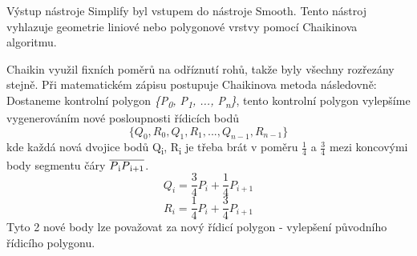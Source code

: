 Výstup nástroje Simplify byl vstupem do nástroje Smooth. Tento nástroj vyhlazuje geometrie
liniové nebo polygonové vrstvy pomocí Chaikinova algoritmu.

Chaikin využil fixních poměrů na odříznutí rohů, takže byly všechny rozřezány stejně. 
Při matematickém zápisu postupuje Chaikinova metoda následovně: Dostaneme kontrolní polygon 
\textit{\{P\textsubscript{0}, P\textsubscript{1}, ..., P\textsubscript{n}\}},
tento kontrolní polygon vylepšíme vygenerováním nové posloupnosti řídicích bodů 
\[ \{Q_0, R_0, Q_1, R_1, ...,  Q_{n−1}, R_{n−1}\} \]                                    
kde každá nová dvojice bodů Q\textsubscript{i}, R\textsubscript{i} je třeba brát v poměru \(\frac{1}{4}\)
a \(\frac{3}{4}\) mezi koncovými body segmentu čáry \(\overline{P\textsubscript{i}P\textsubscript{i+1}}\).
\[Q_i = \frac{3}{4}P_i + \frac{1}{4}P_{i+1}\]
\[R_i = \frac{1}{4}P_i + \frac{3}{4}P_{i+1}\]
Tyto 2 nové body lze považovat za nový řídicí polygon - vylepšení původního řídicího polygonu. \cite{chaikin} 

